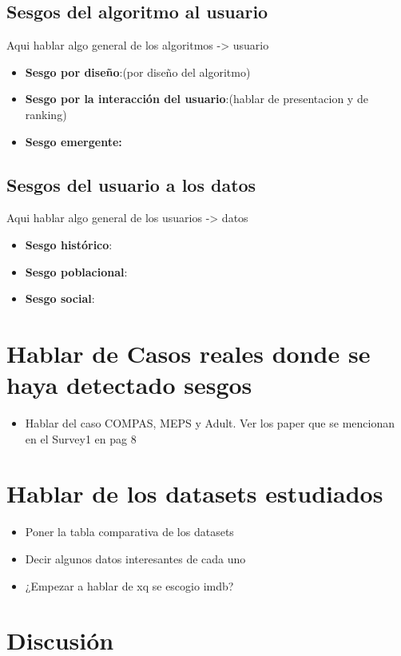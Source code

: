 \subsection{Sesgos del algoritmo al usuario}
Aqui hablar algo general de los algoritmos -> usuario
\begin{itemize}
    \item \textbf{Sesgo por dise\~no}:(por dise\~no del algoritmo)
    \item \textbf{Sesgo por la interacci\'on del usuario}:(hablar de presentacion y de ranking)
    \item \textbf{Sesgo emergente:}
\end{itemize}

\subsection{Sesgos del usuario a los datos}
Aqui hablar algo general de los usuarios -> datos
\begin{itemize}
    \item \textbf{Sesgo hist\'orico}:
    \item \textbf{Sesgo poblacional}:
    \item \textbf{Sesgo social}:
\end{itemize}


\section{Hablar de Casos reales donde se haya detectado sesgos}

    \begin{itemize}
        \item Hablar del caso COMPAS, MEPS y Adult. Ver los paper que se mencionan en el Survey1 en pag 8
    \end{itemize}

\section{Hablar de los datasets estudiados}
    \begin{itemize}
        \item Poner la tabla comparativa de los datasets
        \item Decir algunos datos interesantes de cada uno
        \item ¿Empezar a hablar de xq se escogio imdb?
    \end{itemize}

\section{Discusi\'on}

